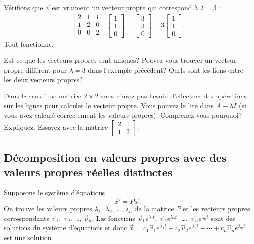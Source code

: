 \begin{example}
Vérifions que $\vec{v}$ est vraiment un vecteur propre qui correspond à $\lambda = 3$ :
\begin{equation*}
\begin{bmatrix}
2 & 1 & 1 \\
1 & 2 & 0 \\
0 & 0 & 2 \\
\end{bmatrix}
\begin{bmatrix}
1 \\
1 \\
0
\end{bmatrix}
=
\begin{bmatrix}
3 \\
3 \\
0
\end{bmatrix}
=
3
\begin{bmatrix}
1 \\
1 \\
0
\end{bmatrix} .
\end{equation*}
Tout fonctionne.
\end{example}

\begin{exercise}[facile]
Est-ce que les vecteurs propres sont uniques? Pouvez-vous trouver un vecteur propre différent pour $\lambda = 3$ dans l’exemple précédent? Quels sont les liens entre les deux vecteurs propres?
\end{exercise}

\begin{exercise}
Dans le cas d’une matrice $2 \times 2$ vous n’avez pas besoin d'effectuer des opérations sur les lignes pour calculer le vecteur propre. Vous pouvez le lire dans $A-\lambda I$
(si vous avez calculé correctement les valeurs propres). Comprenez-vous pourquoi? Expliquez. Essayez avec la matrice
$\left[ \begin{smallmatrix} 2 & 1 \\ 1 & 2 \end{smallmatrix} \right]$.
\end{exercise}

\subsection{Décomposition en valeurs propres avec des valeurs propres réelles distinctes}

Supposons le système d’équations
\begin{equation*}
{\vec{x}}' = P\vec{x} .
\end{equation*}
On trouve les valeurs propres $\lambda_1$, $\lambda_2$, \ldots, $\lambda_n$
de la matrice $P$ et les vecteurs propres correspondants
$\vec{v}_1$, $\vec{v}_2$, \ldots, $\vec{v}_n$.
Les fonctions
$\vec{v}_1 e^{\lambda_1 t}$, 
$\vec{v}_2 e^{\lambda_2 t}$, \ldots,
$\vec{v}_n e^{\lambda_n t}$ sont des solutions du système d'équations et donc
$
\vec{x} = c_1 \vec{v}_1 e^{\lambda_1 t} +
c_2 \vec{v}_2 e^{\lambda_2 t} + \cdots +
c_n \vec{v}_n e^{\lambda_n t}
$
est une solution.

